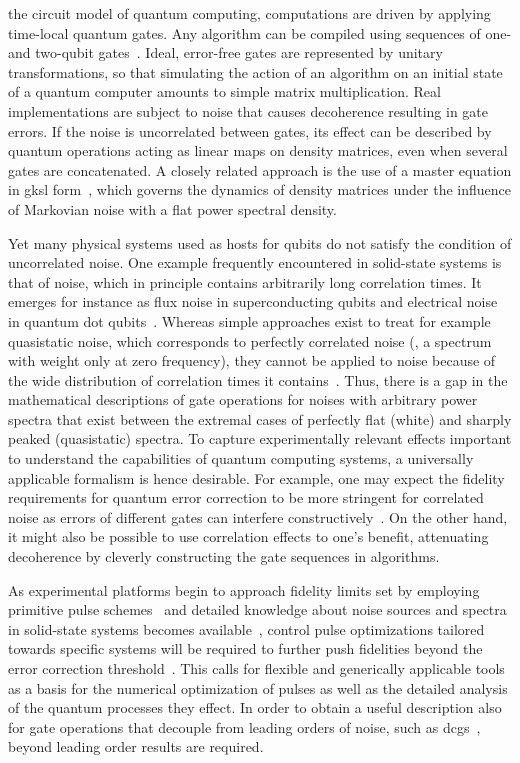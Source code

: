  the circuit model of quantum computing, computations are driven by applying time-local quantum gates.
Any algorithm can be compiled using sequences of one- and two-qubit gates~\cite{DiVincenzo1995}.
Ideal, error-free gates are represented by unitary transformations, so that simulating the action of an algorithm on an initial state of a quantum computer amounts to simple matrix multiplication.
Real implementations are subject to noise that causes decoherence resulting in gate errors.
If the noise is uncorrelated between gates, its effect can be described by quantum operations acting as linear maps on density matrices, even when several gates are concatenated.
A closely related approach is the use of a master equation in \gls{gksl} form~\cite{Gorini1976,Lindblad1976}, which governs the dynamics of density matrices under the influence of Markovian noise with a flat power spectral density.

Yet many physical systems used as hosts for qubits do not satisfy the condition of uncorrelated noise.
One example frequently encountered in solid-state systems is that of \oneoverf noise, which in principle contains arbitrarily long correlation times.
It emerges for instance as flux noise in superconducting qubits and electrical noise in quantum dot qubits~\cite{Brownnutt2015,Kumar2016a,Yoneda2018,Paladino2014}.
Whereas simple approaches exist to treat for example quasistatic noise, which corresponds to perfectly correlated noise (\ie, a spectrum with weight only at zero frequency), they cannot be applied to \oneoverf noise because of the wide distribution of correlation times it contains~\cite{Connors2022}.
Thus, there is a gap in the mathematical descriptions of gate operations for noises with arbitrary power spectra that exist between the extremal cases of perfectly flat (white) and sharply peaked (quasistatic) spectra.
To capture experimentally relevant effects important to understand the capabilities of quantum computing systems, a universally applicable formalism is hence desirable.
For example, one may expect the fidelity requirements for quantum error correction to be more stringent for correlated noise as errors of different gates can interfere constructively~\cite{Ng2009}.
On the other hand, it might also be possible to use correlation effects to one's benefit, attenuating decoherence by cleverly constructing the gate sequences in algorithms.

As experimental platforms begin to approach fidelity limits set by employing primitive pulse schemes~\cite{Veldhorst2014,Debnath2016,Yoneda2018} and detailed knowledge about noise sources and spectra in solid-state systems becomes available~\cite{Dial2013,Quintana2017,Malinowski2017}, control pulse optimizations tailored towards specific systems will be required to further push fidelities beyond the error correction threshold~\cite{Barends2014,Blume-Kohout2017}.
This calls for flexible and generically applicable tools as a basis for the numerical optimization of pulses as well as the detailed analysis of the quantum processes they effect.
In order to obtain a useful description also for gate operations that decouple from leading orders of noise, such as \glspl{dcg}~\cite{Khodjasteh2009}, beyond leading order results are required.

